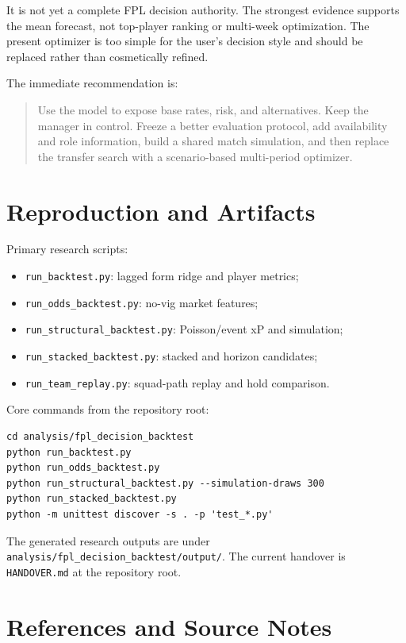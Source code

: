 \documentclass[11pt,a4paper]{article}
\begin{document}
It is not yet a complete FPL decision authority. The strongest evidence supports the mean forecast, not top-player ranking or multi-week optimization. The present optimizer is too simple for the user's decision style and should be replaced rather than cosmetically refined.

The immediate recommendation is:

\begin{quote}
Use the model to expose base rates, risk, and alternatives. Keep the manager in control. Freeze a better evaluation protocol, add availability and role information, build a shared match simulation, and then replace the transfer search with a scenario-based multi-period optimizer.
\end{quote}

\appendix
\section{Reproduction and Artifacts}

Primary research scripts:
\begin{itemize}
  \item \texttt{run\_backtest.py}: lagged form ridge and player metrics;
  \item \texttt{run\_odds\_backtest.py}: no-vig market features;
  \item \texttt{run\_structural\_backtest.py}: Poisson/event xP and simulation;
  \item \texttt{run\_stacked\_backtest.py}: stacked and horizon candidates;
  \item \texttt{run\_team\_replay.py}: squad-path replay and hold comparison.
\end{itemize}

Core commands from the repository root:
\begin{verbatim}
cd analysis/fpl_decision_backtest
python run_backtest.py
python run_odds_backtest.py
python run_structural_backtest.py --simulation-draws 300
python run_stacked_backtest.py
python -m unittest discover -s . -p 'test_*.py'
\end{verbatim}

The generated research outputs are under
\texttt{analysis/fpl\_decision\_backtest/output/}. The current handover is
\texttt{HANDOVER.md} at the repository root.

\section{References and Source Notes}
\end{document}
